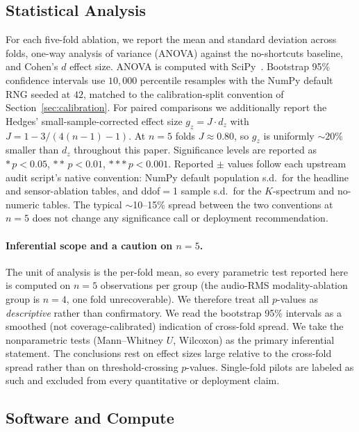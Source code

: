 \documentclass[sensors,article,submit,moreauthors,pdftex]{Definitions/mdpi}
\begin{document}
\subsection{Statistical Analysis}
\label{sec:stats}

For each five-fold ablation, we report the mean and standard deviation across folds, one-way analysis of variance (ANOVA) against the no-shortcuts baseline, and Cohen's $d$ effect size. ANOVA is computed with SciPy~\cite{virtanen2020scipy}. Bootstrap 95\% confidence intervals use $10{,}000$ percentile resamples with the NumPy default RNG seeded at $42$, matched to the calibration-split convention of Section~\ref{sec:calibration}. For paired comparisons we additionally report the Hedges' small-sample-corrected effect size $g_z\!=\!J\!\cdot\!d_z$ with $J\!=\!1\!-\!3/(4(n\!-\!1)\!-\!1)$. At $n\!=\!5$ folds $J\!\approx\!0.80$, so $g_z$ is uniformly $\sim$$20\%$ smaller than $d_z$ throughout this paper. Significance levels are reported as $\ast\,p<0.05$, $\ast\ast\,p<0.01$, $\ast\ast\ast\,p<0.001$. Reported $\pm$ values follow each upstream audit script's native convention: NumPy default population s.d.\ for the headline and sensor-ablation tables, and ddof$=$1 sample s.d.\ for the $K$-spectrum and no-numeric tables. The typical $\sim$10--15\% spread between the two conventions at $n\!=\!5$ does not change any significance call or deployment recommendation.

\paragraph{Inferential scope and a caution on $n=5$.} The unit of analysis is the per-fold mean, so every parametric test reported here is computed on $n=5$ observations per group (the audio-RMS modality-ablation group is $n=4$, one fold unrecoverable). We therefore treat all $p$-values as \emph{descriptive} rather than confirmatory. We read the bootstrap 95\% intervals as a smoothed (not coverage-calibrated) indication of cross-fold spread. We take the nonparametric tests (Mann--Whitney $U$, Wilcoxon) as the primary inferential statement. The conclusions rest on effect sizes large relative to the cross-fold spread rather than on threshold-crossing $p$-values. Single-fold pilots are labeled as such and excluded from every quantitative or deployment claim.

\subsection{Software and Compute}
\label{sec:software}
\end{document}
